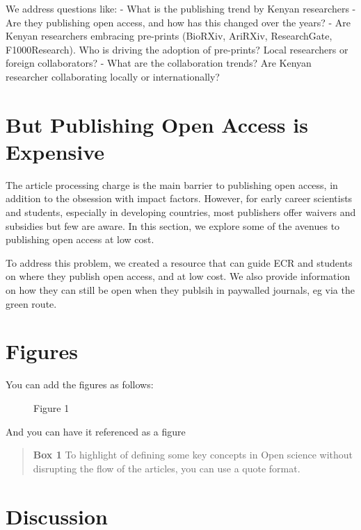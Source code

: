We address questions like: - What is the publishing trend by Kenyan
researchers - Are they publishing open access, and how has this changed
over the years? - Are Kenyan researchers embracing pre-prints (BioRXiv,
AriRXiv, ResearchGate, F1000Research). Who is driving the adoption of
pre-prints? Local researchers or foreign collaborators? - What are the
collaboration trends? Are Kenyan researcher collaborating locally or
internationally?

\section*{But Publishing Open Access is
Expensive}\label{but-publishing-open-access-is-expensive}

The article processing charge is the main barrier to publishing open
access, in addition to the obsession with impact factors. However, for
early career scientists and students, especially in developing
countries, most publishers offer waivers and subsidies but few are
aware. In this section, we explore some of the avenues to publishing
open access at low cost.

To address this problem, we created a resource that can guide ECR and
students on where they publish open access, and at low cost. We also
provide information on how they can still be open when they publsih in
paywalled journals, eg via the green route.

\section*{Figures}\label{figures}

You can add the figures as follows:

\begin{figure}[htbp]
\centering
\caption{Figure 1}
\end{figure}

And you can have it referenced as a figure

\begin{quote}
\textbf{Box 1} To highlight of defining some key concepts in Open
science without disrupting the flow of the articles, you can use a quote
format.
\end{quote}

\section*{Discussion}\label{discussion}

